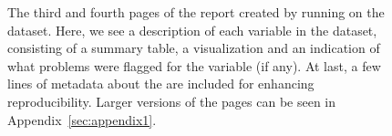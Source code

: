 \documentclass[article,shortnames]{jss}
\begin{document}
\begin{figure}[tb]
\begin{center}
%
\end{center}
\caption{The third and fourth pages of the report created by running  on the 
  dataset. Here, we see a description of each variable in the dataset, consisting of a summary table, a visualization and an indication of what problems were flagged for the variable (if any). At last, a few lines of metadata about the  are included for enhancing reproducibility. Larger versions of the pages can be seen in
  Appendix~\ref{sec:appendix1}.}
\label{fig:example2}
\end{figure}
\end{document}
